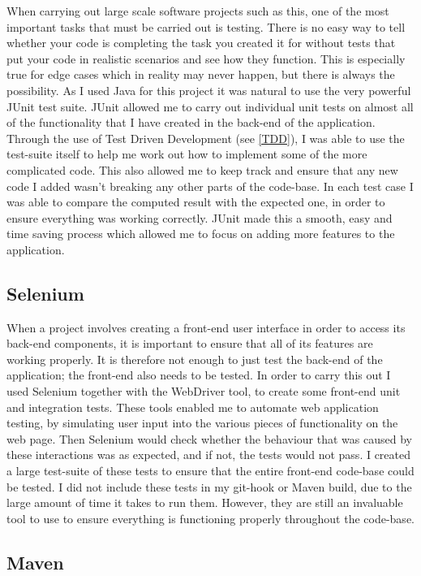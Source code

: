 When carrying out large scale software projects such as this, one of the most important tasks that must be carried out is testing. There is no easy way to tell whether your code is completing the task you created it for without tests that put your code in realistic scenarios and see how they function. This is especially true for edge cases which in reality may never happen, but there is always the possibility. As I used Java for this project it was natural to use the very powerful JUnit test suite. JUnit allowed me to carry out individual unit tests on almost all of the functionality that I have created in the back-end of the application. Through the use of Test Driven Development (see \ref{TDD}), I was able to use the test-suite itself to help me work out how to implement some of the more complicated code. This also allowed me to keep track and ensure that any new code I added wasn't breaking any other parts of the code-base. In each test case I was able to compare the computed result with the expected one, in order to ensure everything was working correctly. JUnit made this a smooth, easy and time saving process which allowed me to focus on adding more features to the application.

\subsection{Selenium \label{selenium}}

When a project involves creating a front-end user interface in order to access its back-end components, it is important to ensure that all of its features are working properly. It is therefore not enough to just test the back-end of the application; the front-end also needs to be tested. In order to carry this out I used Selenium together with the WebDriver tool, to create some front-end unit and integration tests. These tools enabled me to automate web application testing, by simulating user input into the various pieces of functionality on the web page. Then Selenium would check whether the behaviour that was caused by these interactions was as expected, and if not, the tests would not pass. I created a large test-suite of these tests to ensure that the entire front-end code-base could be tested. I did not include these tests in my git-hook or Maven build, due to the large amount of time it takes to run them. However, they are still an invaluable tool to use to ensure everything is functioning properly throughout the code-base.

\subsection{Maven \label{maven}}

